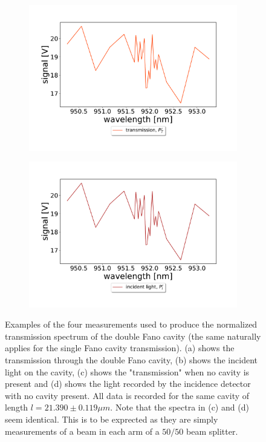\begin{figure}[h!]
\begin{subfigure}[b]{0.49\textwidth}
        \includegraphics[width=\textwidth]{figures/raw_data_transmission_no_cavity.pdf}
        \caption{}
        \label{fig:raw_data_trans_no_cavity}
    \end{subfigure}
    \begin{subfigure}[b]{0.49\textwidth}
        \includegraphics[width=\textwidth]{figures/raw_data_incident_light_no_cavity.pdf}
        \caption{}
        \label{fig:raw_data_incident_no_cavity}
    \end{subfigure}
    \caption{Examples of the four measurements used to produce the normalized transmission spectrum of the double Fano cavity (the same naturally applies for the single Fano cavity transmission). (a) shows the transmission through the double Fano cavity, (b) shows the incident light on the cavity, (c) shows the "transmission" when no cavity is present and (d) shows the light recorded by the incidence detector with no cavity present. All data is recorded for the same cavity of length $l=21.390 \pm 0.119 \mu m$. Note that the spectra in (c) and (d) seem identical. This is to be exprected as they are simply measurements of a beam in each arm of a $50/50$ beam splitter.}
    \label{fig:raw_data}
\end{figure}

